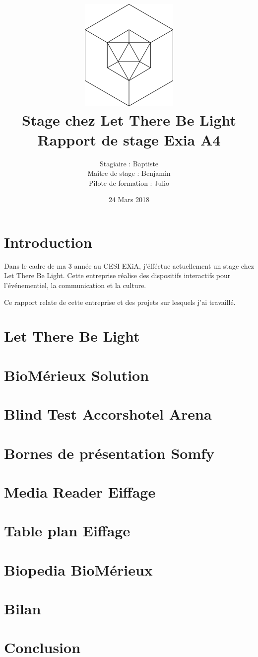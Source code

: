 \documentclass{article}
\title{\includegraphics{img/logo.png}\vspace{2cm}\\
    Stage chez Let There Be Light \\
    \large Rapport de stage Exia A4}
\date{24 Mars 2018}
\author{Stagiaire : Baptiste \bsc{Saclier} \\
    Maître de stage : Benjamin \bsc{Petit}\\
    Pilote de formation : Julio \bsc{Santilario}}
\begin{document}
    \maketitle

    \clearpage

    \tableofcontents

    \section{Introduction}

    Dans le cadre de ma 3 année au CESI EXiA, j'éfféctue actuellement un stage chez Let There Be Light.
    Cette entreprise réalise des dispositifs interactifs pour l'événementiel, la communication et la culture.

    Ce rapport relate de cette entreprise et des projets sur lesquels j'ai travaillé.

    \clearpage

    \section{Let There Be Light}
    

    \section{BioMérieux Solution}
    

    \section{Blind Test Accorshotel Arena}

    \section{Bornes de présentation Somfy}

    \section{Media Reader Eiffage}

    \section{Table plan Eiffage}

    \section{Biopedia BioMérieux}

    \section{Bilan}

    \section{Conclusion}
\end{document}
